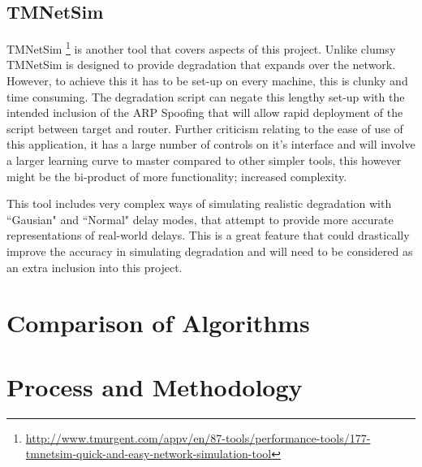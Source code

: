 \subsection{TMNetSim}
TMNetSim \footnote{\url{http://www.tmurgent.com/appv/en/87-tools/performance-tools/177-tmnetsim-quick-and-easy-network-simulation-tool}} is another tool that covers aspects of this project. Unlike clumsy TMNetSim is designed to provide degradation that expands over the network. However, to achieve this it has to be set-up on every machine, this is clunky and time consuming. The degradation script can negate this lengthy set-up with the intended inclusion of the ARP Spoofing that will allow rapid deployment of the script between target and router. Further criticism relating to the ease of use of this application, it has a large number of controls on it's interface and will involve a larger learning curve to master compared to other simpler tools, this however might be the bi-product of more functionality; increased complexity.

This tool includes very complex ways of simulating realistic degradation with ``Gausian" and ``Normal" delay modes, that attempt to provide more accurate representations of real-world delays. This is a great feature that could drastically improve the accuracy in simulating degradation and will need to be considered as an extra inclusion into this project.

\section{Comparison of Algorithms}



\section{Process and Methodology}
